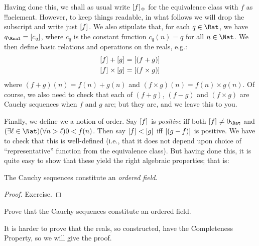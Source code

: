 \documentclass[../../../include/open-logic-section]{subfiles}
\begin{document}
Having done this, we shall as usual write $[f]_{\Bumpeq}$
for the equivalence class with $f$ as !!a{element}. However, to keep
things readable, in what follows we will drop the subscript and write
just $[f]_{}$. We also stipulate that, for each $q \in \Rat$,
we have $q_{\Real} = \equivrep{c_{q}}{}$, where $c_{q}$ is the
constant function $c_q(n) = q$ for all $n \in \Nat$. We then define
basic relations and operations on the reals, e.g.:
\begin{align*}
	\equivrep{f}{} + \equivrep{g}{} &= 	\equivrep{(f + g)}{} \\
	\equivrep{f}{} \times 	\equivrep{g}{} &= \equivrep{(f \times g)}{} 
\end{align*}
where $(f + g)(n) = f(n) + g(n)$ and $(f \times g)(n) = f(n) \times
g(n)$. Of course, we also need to check that each of  $(f + g)$,
$(f-g)$ and $(f\times g)$ are Cauchy sequences when $f$ and $g$ are;
but they are, and we leave this to you.

Finally, we define we a notion of order. Say $[f]_{}$ is
\emph{positive} iff both $\equivrep{f}{}\neq 0_\Rat$ and $(\exists
\ell \in \Nat)(\forall n > \ell)0 < f(n)$. Then say $[f]_{} <
[g]_{}$ iff $[(g - f)]_{}$ is positive. We have to
check that this is well-defined (i.e., that it does not depend upon
choice of ``representative'' function from the equivalence class). 
But having done this, it is quite easy to show that these yield the
right algebraic properties; that is:
\begin{thm}
The Cauchy sequences constitute an \emph{ordered field}.
\end{thm}

\begin{proof}
Exercise. 
\end{proof}

\begin{prob}
Prove that the Cauchy sequences constitute an ordered field.
\end{prob}

It is harder to prove that the reals, so constructed, have the
Completeness Property, so we will give the proof.
\end{document}
